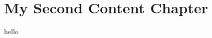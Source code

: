 \chapter{My Second Content Chapter}
\label{chapter3}

\blindtext
hello\cite{andrieu2003introduction}
